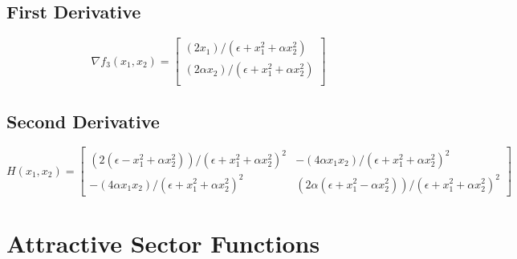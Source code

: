 \documentclass[a4paper]{article}
\begin{document}
\subsection{First Derivative}

\[
\nabla f_3(x_1, x_2) = 
\begin{bmatrix}
  (2x_1)/(\epsilon + x_1^2 + \alpha x_2^2)\\
  (2\alpha x_2)/(\epsilon + x_1^2 + \alpha x_2^2)\\
\end{bmatrix}
\]


\subsection{Second Derivative}
\label{subsec:label}
\[
H(x_1,x_2) = 
\begin{bmatrix}
  (2 (\epsilon - x_1^2 + \alpha x_2^2))/(\epsilon + x_1^2 + \alpha x_2^2)^2
  &
  -(4 \alpha x_1 x_2)/(\epsilon + x_1^2 + \alpha x_2^2)^2  \\
  -(4 \alpha x_1 x_2)/(\epsilon + x_1^2 + \alpha x_2^2)^2
  &
  (2 \alpha (\epsilon + x_1^2 - \alpha x_2^2))/(\epsilon + x_1^2 + \alpha x_2^2)^2
\end{bmatrix}
\]


\section{Attractive Sector Functions}
\label{sec:attractive}
\end{document}
